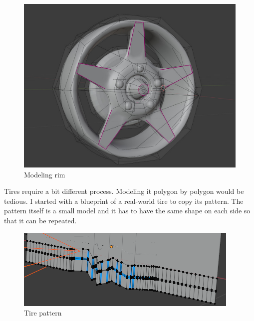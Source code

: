 \documentclass[12pt,a4paper,titlepage,final]{report}
\begin{document}
\begin{figure}[H]
    \centering
    \includegraphics{images/rim.jpg}
    \caption{Modeling rim}
    \label{fig:rim}
\end{figure}

Tires require a bit different process. Modeling it polygon by polygon would be tedious. I started with a blueprint of a real-world tire to copy its pattern. The pattern itself is a small model and it has to have the same shape on each side so that it can be repeated.


\begin{figure}[H]
    \centering
    \includegraphics{images/tire_pattern.png}
    \caption{Tire pattern}
    \label{fig:tire_pattern}
\end{figure}
\end{document}
